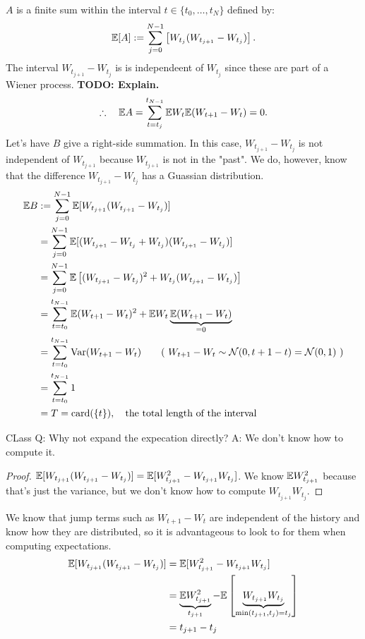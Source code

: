 \begin{example}
	$A$ is a finite sum within the interval  $t\in \{t_0,\ldots, t_N\}$ defined by: 
	\[ \mathbb{E}[A] := \sum_{j=0}^{N-1} \left[ W_{t_j} (W_{t_{j+1}} - W_{t_j}) \right]. \]				
	The interval $W_{t_{j+1}} - W_{t_j}$ is is independeent of $W_{t_j}$ since these are part of a Wiener process.   \textbf{TODO: Explain.} 
	\[\therefore \quad \mathbb{E} A 
		= \sum_{t=t_j}^{t_{N-1}} \mathbb{E} W_t \mathbb{E} (W_{t+1} - W_t)
		= 0 .\]
	Let's have $B$ give a right-side summation. In this case, $W_{t_{j+1}} - W_{t_j}$ is not independent of $W_{t_{j+1}}$ because $W_{t_{j+1}}$ is not in the "past". We do, however, know that the difference $W_{t_{j+1}} - W_{t_j}$ has a Guassian distribution.
\begin{align*}
	\E B 
	&:= \sum_{j=0}^{N-1} 
		\E [W_{t_{j+1}} 
		(W_{t_{j+1}} - W_{t_j}) ] \\
	&= \sum_{j=0}^{N-1} 
	\E [(W_{t_{j+1}} - W_{t_j} 
		+ W_{t_j})(W_{t_{j+1}} - W_{t_j}) ] \\
	&= \sum_{j=0}^{N-1} 
		\E \left[  
			(W_{t_{j+1}} - W_{t_j})^2 + 
			W_{t_j} (W_{t_{j+1}} - W_{t_j} ) 
			\right]   \\ 
	&= \sum_{t = t_0}^{t_{N-1}} \E (W_{t+1} - W_t)^2 
		+ \E W_t \underbrace{ \E (W_{t+1} - W_t) }_{=0} \\
	&= \sum_{t = t_0}^{t_{N-1}} 
		\Var (W_{t+1} - W_t) 
		\tag{ $W_{t+1} - W_t \sim \mathcal{N}(0, t+1-t) 
			= \mathcal{N}(0, 1)$ } \\
	&= \sum_{t = t_0}^{t_{N-1}} 1  \\ 
	&= T = \text{card} (\{ t \}),  \quad \text{the total length of the interval}
\end{align*} 
\end{example}

CLass Q: Why not expand the expecation directly? A: We don't know how to compute it. 
\begin{proof}
	$\mathbb{E} [ W_{t_{j+1}} (W_{t_{j+1}} - W_{t_j}) ] 
		= \mathbb{E} [W_{t_{j+1}}^2 - W_{t_{j+1}}W_{t_j}  ]$. We know 
	$\mathbb{E} W_{t_{j+1}}^2$ because that's just the variance, but we don't know how to compute $W_{t_{j+1}} W_{t_j}$. 
\end{proof}

We know that jump terms such as $W_{t+1} - W_t$ are independent of the history and know how they are distributed, so it is advantageous to look to for them when computing expectations.
\begin{align*}
\mathbb{E} [ W_{t_{j+1}} (W_{t_{j+1}} - W_{t_j}) ] 
	&= \mathbb{E} [W_{t_{j+1}}^2 - W_{t_{j+1}}W_{t_j}  ] \\
	&= \underbrace{ \mathbb{E} W_{t_{j+1}}^2 }_{t_{j+1}}
		- \mathbb{E} \left[  
		\underbrace{ W_{t_{j+1}} W_{t_j} }_{\min(t_{j+1}, t_j) = t_j 
		} \right] \\
	&= t_{j+1} - t_j
\end{align*}

